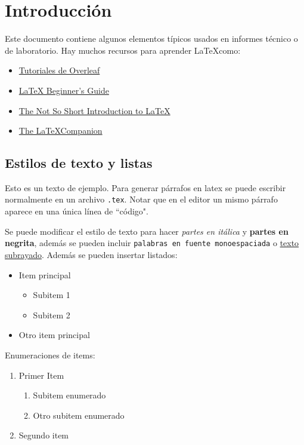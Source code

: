 \section{Introducción}

Este documento contiene algunos elementos típicos usados en informes técnico o de laboratorio. Hay muchos recursos para aprender \LaTeX como:

\begin{itemize}
    \item \href{https://www.overleaf.com/learn}{Tutoriales de Overleaf}
    \item \href{https://latexguide.org/}{LaTeX Beginner's Guide}
    \item \href{https://tobi.oetiker.ch/lshort/lshort.pdf}{The Not So Short Introduction to \LaTeX}
    \item \href{https://www.latex-project.org/help/books/tlc3-digital-chapter-samples.pdf}{The \LaTeX Companion}
\end{itemize}

\subsection{Estilos de texto y listas}

Esto es un texto de ejemplo. Para generar párrafos en latex se puede escribir normalmente en un archivo \texttt{.tex}. Notar que en el editor un mismo párrafo aparece en una única línea de ``código".

Se puede modificar el estilo de texto para hacer \textit{partes en itálica} y \textbf{partes en negrita}, además se pueden incluir \texttt{palabras en fuente monoespaciada} o \underline{texto subrayado}. Además se pueden insertar listados:

\begin{itemize}
    \item Item principal
    \begin{itemize}
        \item Subitem 1
        \item Subitem 2
    \end{itemize}
    \item Otro item principal
\end{itemize}

Enumeraciones de items:

\begin{enumerate}
    \item Primer Item
    \begin{enumerate}
        \item Subitem enumerado
        \item Otro subitem enumerado
    \end{enumerate}
    \item Segundo item
\end{enumerate}

